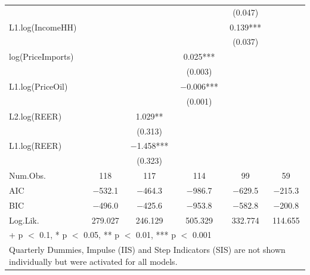 \begin{table}
{\begin{tabular}[t]{lccccc}
 &  &  &  & (\num{0.047}) & \\
L1.log(IncomeHH) &  &  &  & \num{0.139}*** & \\
 &  &  &  & (\num{0.037}) & \\
log(PriceImports) &  &  & \num{0.025}*** &  & \\
 &  &  & (\num{0.003}) &  & \\
L1.log(PriceOil) &  &  & \num{-0.006}*** &  & \\
 &  &  & (\num{0.001}) &  & \\
L2.log(REER) &  & \num{1.029}** &  &  & \\
 &  & (\num{0.313}) &  &  & \\
L1.log(REER) &  & \num{-1.458}*** &  &  & \\
 &  & (\num{0.323}) &  &  & \\
\midrule
Num.Obs. & \num{118} & \num{117} & \num{114} & \num{99} & \num{59}\\
AIC & \num{-532.1} & \num{-464.3} & \num{-986.7} & \num{-629.5} & \num{-215.3}\\
BIC & \num{-496.0} & \num{-425.6} & \num{-953.8} & \num{-582.8} & \num{-200.8}\\
Log.Lik. & \num{279.027} & \num{246.129} & \num{505.329} & \num{332.774} & \num{114.655}\\
\bottomrule
\multicolumn{6}{l}{\rule{0pt}{1em}+ p $<$ 0.1, * p $<$ 0.05, ** p $<$ 0.01, *** p $<$ 0.001}\\
\multicolumn{6}{l}{\rule{0pt}{1em}Quarterly Dummies, Impulse (IIS) and Step Indicators (SIS) are not shown individually but were activated for all models.}\\
\end{tabular}}
\end{table}

